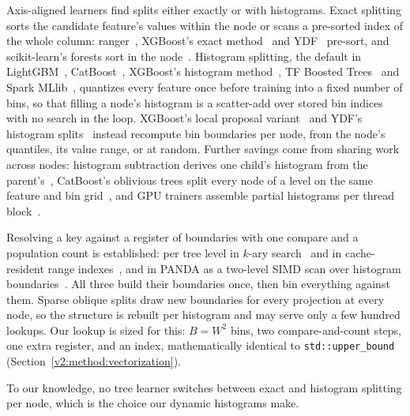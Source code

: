 \documentclass[sigconf]{acmart}%
\begin{document}
Axis-aligned learners find splits either exactly or with histograms. Exact splitting sorts the candidate feature's values within the node or scans a pre-sorted index of the whole column: ranger~\cite{wright2017ranger}, XGBoost's exact method~\cite{chen2016xgboost} and YDF~\cite{ydf} pre-sort, and scikit-learn's forests sort in the node~\cite{pedregosa2011scikit}. Histogram splitting, the default in LightGBM~\cite{ke2017lightgbm}, CatBoost~\cite{prokhorenkova2018catboost}, XGBoost's histogram method~\cite{chen2016xgboost}, TF Boosted Trees~\cite{ponomareva2017tf} and Spark MLlib~\cite{meng2016mllib}, quantizes every feature once before training into a fixed number of bins, so that filling a node's histogram is a scatter-add over stored bin indices with no search in the loop. XGBoost's local proposal variant~\cite{chen2016xgboost} and YDF's histogram splits~\cite{ydf} instead recompute bin boundaries per node, from the node's quantiles, its value range, or at random. Further savings come from sharing work across nodes: histogram subtraction derives one child's histogram from the parent's~\cite{ke2017lightgbm}, CatBoost's oblivious trees split every node of a level on the same feature and bin grid~\cite{prokhorenkova2018catboost}, and GPU trainers assemble partial histograms per thread block~\cite{wenthundergbm19,xu2025scalagbm}. 

Resolving a key against a register of boundaries with one compare and a population count is established: per tree level in $k$-ary search~\cite{schlegel2009k} and in cache-resident range indexes~\cite{polychroniou_comprehensive_2014}, and in PANDA as a two-level SIMD scan over histogram boundaries~\cite{patwary_panda_2016}. All three build their boundaries once, then bin everything against them. Sparse oblique splits draw new boundaries for every projection at every node, so the structure is rebuilt per histogram and may serve only a few hundred lookups. Our lookup is sized for this: $B = W^2$ bins, two compare-and-count steps, one extra register, and an index, mathematically identical to \texttt{std::upper\_bound} (Section~\ref{v2:method:vectorization}).

To our knowledge, no tree learner switches between exact and histogram splitting per node, which is the choice our dynamic histograms make.
\end{document}
